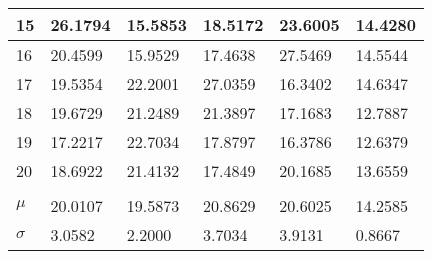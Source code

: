 \documentclass[12pt,a4paper]{article}	%
\begin{document}
\begin{table}[h]
\begin{tabular}{ |P{1cm}||P{2.5cm}|P{2.5cm}|P{2.5cm}|P{2.5cm}|P{2.5cm}| }
	 15 &26.1794&15.5853 &18.5172&23.6005&14.4280 \\ \hline
	
	 16 &20.4599&15.9529 &17.4638 &27.5469&14.5544 \\
	
	 17 &19.5354&22.2001 &27.0359 &16.3402&14.6347 \\
	
	 18 &19.6729&21.2489 &21.3897 &17.1683&12.7887 \\
	
	 19 &17.2217&22.7034 &17.8797 &16.3786&12.6379 \\
	
	 20 &18.6922&21.4132 &17.4849 &20.1685&13.6559 \\ 
	 &&&&&\\ \hline
	$\mu$&20.0107&19.5873&20.8629&20.6025&14.2585\\ \hline
	$\sigma$&3.0582&2.2000&3.7034&3.9131&0.8667\\ \hline
	

\end{tabular}
  \newline\newline
\end{table}
\end{document}
